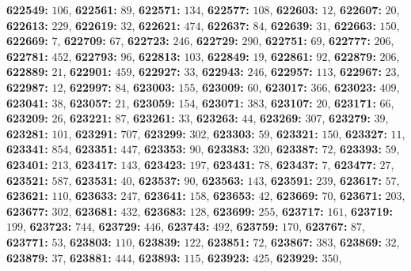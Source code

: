 \textsf{\bfseries 622549:} $106$, \textsf{\bfseries 622561:} $89$, \textsf{\bfseries 622571:} $134$, \textsf{\bfseries 622577:} $108$, \textsf{\bfseries 622603:} $12$, \textsf{\bfseries 622607:} $20$, \textsf{\bfseries 622613:} $229$, \textsf{\bfseries 622619:} $32$, \textsf{\bfseries 622621:} $474$, \textsf{\bfseries 622637:} $84$, \textsf{\bfseries 622639:} $31$, \textsf{\bfseries 622663:} $150$, \textsf{\bfseries 622669:} $7$, \textsf{\bfseries 622709:} $67$, \textsf{\bfseries 622723:} $246$, \textsf{\bfseries 622729:} $290$, \textsf{\bfseries 622751:} $69$, \textsf{\bfseries 622777:} $206$, \textsf{\bfseries 622781:} $452$, \textsf{\bfseries 622793:} $96$, \textsf{\bfseries 622813:} $103$, \textsf{\bfseries 622849:} $19$, \textsf{\bfseries 622861:} $92$, \textsf{\bfseries 622879:} $206$, \textsf{\bfseries 622889:} $21$, \textsf{\bfseries 622901:} $459$, \textsf{\bfseries 622927:} $33$, \textsf{\bfseries 622943:} $246$, \textsf{\bfseries 622957:} $113$, \textsf{\bfseries 622967:} $23$, \textsf{\bfseries 622987:} $12$, \textsf{\bfseries 622997:} $84$, \textsf{\bfseries 623003:} $155$, \textsf{\bfseries 623009:} $60$, \textsf{\bfseries 623017:} $366$, \textsf{\bfseries 623023:} $409$, \textsf{\bfseries 623041:} $38$, \textsf{\bfseries 623057:} $21$, \textsf{\bfseries 623059:} $154$, \textsf{\bfseries 623071:} $383$, \textsf{\bfseries 623107:} $20$, \textsf{\bfseries 623171:} $66$, \textsf{\bfseries 623209:} $26$, \textsf{\bfseries 623221:} $87$, \textsf{\bfseries 623261:} $33$, \textsf{\bfseries 623263:} $44$, \textsf{\bfseries 623269:} $307$, \textsf{\bfseries 623279:} $39$, \textsf{\bfseries 623281:} $101$, \textsf{\bfseries 623291:} $707$, \textsf{\bfseries 623299:} $302$, \textsf{\bfseries 623303:} $59$, \textsf{\bfseries 623321:} $150$, \textsf{\bfseries 623327:} $11$, \textsf{\bfseries 623341:} $854$, \textsf{\bfseries 623351:} $447$, \textsf{\bfseries 623353:} $90$, \textsf{\bfseries 623383:} $320$, \textsf{\bfseries 623387:} $72$, \textsf{\bfseries 623393:} $59$, \textsf{\bfseries 623401:} $213$, \textsf{\bfseries 623417:} $143$, \textsf{\bfseries 623423:} $197$, \textsf{\bfseries 623431:} $78$, \textsf{\bfseries 623437:} $7$, \textsf{\bfseries 623477:} $27$, \textsf{\bfseries 623521:} $587$, \textsf{\bfseries 623531:} $40$, \textsf{\bfseries 623537:} $90$, \textsf{\bfseries 623563:} $143$, \textsf{\bfseries 623591:} $239$, \textsf{\bfseries 623617:} $57$, \textsf{\bfseries 623621:} $110$, \textsf{\bfseries 623633:} $247$, \textsf{\bfseries 623641:} $158$, \textsf{\bfseries 623653:} $42$, \textsf{\bfseries 623669:} $70$, \textsf{\bfseries 623671:} $203$, \textsf{\bfseries 623677:} $302$, \textsf{\bfseries 623681:} $432$, \textsf{\bfseries 623683:} $128$, \textsf{\bfseries 623699:} $255$, \textsf{\bfseries 623717:} $161$, \textsf{\bfseries 623719:} $199$, \textsf{\bfseries 623723:} $744$, \textsf{\bfseries 623729:} $446$, \textsf{\bfseries 623743:} $492$, \textsf{\bfseries 623759:} $170$, \textsf{\bfseries 623767:} $87$, \textsf{\bfseries 623771:} $53$, \textsf{\bfseries 623803:} $110$, \textsf{\bfseries 623839:} $122$, \textsf{\bfseries 623851:} $72$, \textsf{\bfseries 623867:} $383$, \textsf{\bfseries 623869:} $32$, \textsf{\bfseries 623879:} $37$, \textsf{\bfseries 623881:} $444$, \textsf{\bfseries 623893:} $115$, \textsf{\bfseries 623923:} $425$, \textsf{\bfseries 623929:} $350$, 
